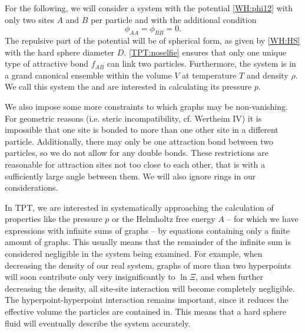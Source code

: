 \documentclass[8.5pt,twoside,twocolumn]{article}
\theoremstyle{standard}
\begin{document}
For the following, we will consider a system with the potential \eqref{WH:phi12}
with only two sites $A$ and $B$ per particle and with the additional condition
\begin{equation}
\phi_{AA}=\phi_{BB}=0.
\label{TPT:noselfie}
\end{equation} 
The repulsive part of the potential will be of spherical form, as given by \eqref{WH:HS}
with the hard sphere diameter $D$. \eqref{TPT:noselfie} ensures that only one unique type
of attractive bond $f_{AB}$ can link two particles. Furthermore, the system is in a
grand canonical ensemble within the volume $V$ at temperature $T$ and density $\rho$.
We call this system the  and are interested in calculating its pressure $p$. 

We also impose some more constraints to which graphs may be non-vanishing. For
geometric reasons (i.e. steric incompatibility, cf. Wertheim IV\cite{Wertheim4})
it is impossible that one site is bonded to more than one other site in a
different particle. Additionally, there may only be one attraction bond between
two particles, so we do not allow for any double bonds. These restrictions are
reasonable for attraction sites not too close to each other, that is with a
sufficiently large angle between them. We will also ignore rings in our
considerations.

In TPT, we are interested in systematically approaching the calculation of properties like
the pressure $p$ or the Helmholtz free energy $A$ -- for which we have expressions
with infinite sums of graphs -- by equations containing only a finite amount of graphs.
This usually means that the remainder of the infinite sum is considered negligible in the
system being examined. For example, when decreasing the density of our real system, graphs of
more than two hyperpoints will soon contribute only very insignificantly to $\ln\Xi$, and when further
decreasing the density, all site-site interaction will become completely negligible.
The hyperpoint-hyperpoint interaction remains important, since it reduces the
effective volume the particles are contained in. This means that a hard sphere fluid will
eventually describe the system accurately.
\end{document}
